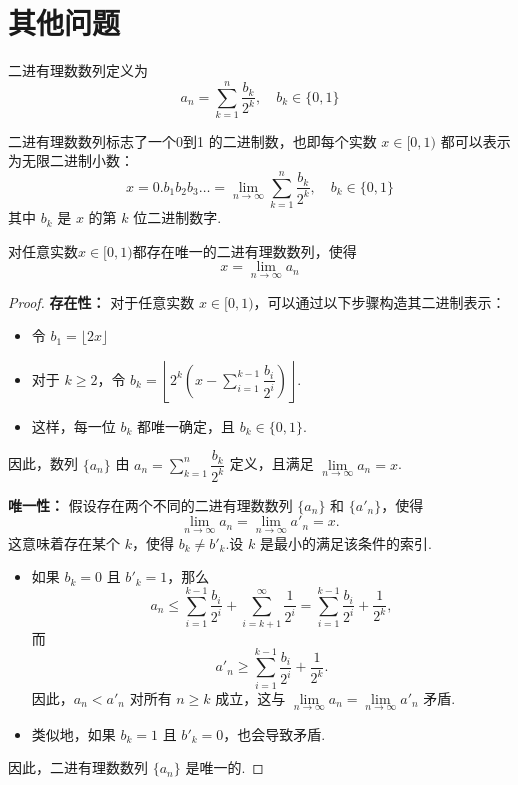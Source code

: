 \section{其他问题}
\begin{definition}
	二进有理数数列定义为$$a_n=\sum_{k=1}^n \frac{b_k}{2^k}, \quad b_k \in \{0,1\}$$
\end{definition}
二进有理数数列标志了一个0到1 的二进制数，也即每个实数 \( x \in [0,1) \) 都可以表示为无限二进制小数：
\[
x = 0.b_1b_2b_3\ldots = \lim\limits_{n\to\infty}\sum_{k=1}^n \frac{b_k}{2^k}, \quad b_k \in \{0,1\}
\]
其中 \( b_k \) 是 \( x \) 的第 \( k \) 位二进制数字.
\begin{proposition}
	对任意实数$x\in[0,1)$都存在唯一的二进有理数数列，使得$$x=\lim_{n \to \infty}a_n$$
\end{proposition}
\begin{proof}
	\textbf{存在性：}
	对于任意实数 $x \in [0,1)$，可以通过以下步骤构造其二进制表示：
	\begin{itemize}
		\item 令 $b_1 = \lfloor 2x \rfloor$
		\item 对于 $k \geqslant 2$，令 $b_k = \left\lfloor 2^k \left(x - \sum\limits_{i=1}^{k-1} \dfrac{b_i}{2^i}\right) \right\rfloor$.
		\item 这样，每一位 $b_k$ 都唯一确定，且 $b_k \in \{0,1\}$.
	\end{itemize}
	因此，数列 $\{a_n\}$ 由 $a_n = \sum\limits_{k=1}^n \dfrac{b_k}{2^k}$ 定义，且满足 $\lim\limits_{n \to \infty} a_n = x$.
	
	\textbf{唯一性：}
	假设存在两个不同的二进有理数数列 $\{a_n\}$ 和 $\{a'_n\}$，使得
	\[
	\lim_{n \to \infty} a_n = \lim_{n \to \infty} a'_n = x.
	\]
	这意味着存在某个 $k$，使得 $b_k \neq b'_k$.设 $k$ 是最小的满足该条件的索引.
	\begin{itemize}
		\item 如果 $b_k = 0$ 且 $b'_k = 1$，那么
		\[
		a_n \leqslant \sum_{i=1}^{k-1} \frac{b_i}{2^i} + \sum_{i=k+1}^\infty \frac{1}{2^i} = \sum_{i=1}^{k-1} \frac{b_i}{2^i} + \frac{1}{2^k},
		\]
		而
		\[
		a'_n \geqslant \sum_{i=1}^{k-1} \frac{b_i}{2^i} + \frac{1}{2^k}.
		\]
		因此，$a_n < a'_n$ 对所有 $n \geqslant k$ 成立，这与 $\lim\limits_{n \to \infty} a_n = \lim\limits_{n \to \infty} a'_n$ 矛盾.
		\item 类似地，如果 $b_k = 1$ 且 $b'_k = 0$，也会导致矛盾.
	\end{itemize}
	因此，二进有理数数列 $\{a_n\}$ 是唯一的.
	
\end{proof}
